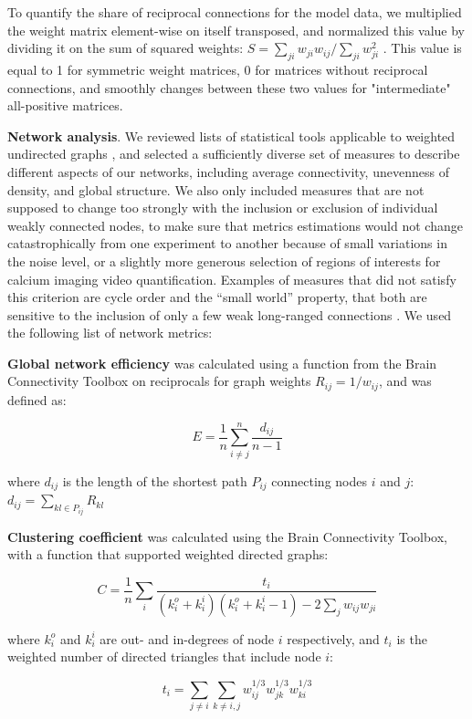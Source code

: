 \documentclass{article}
\begin{document}
To quantify the share of reciprocal connections for the model data, we multiplied the weight matrix element-wise on itself transposed, and normalized this value by dividing it on the sum of squared weights: $S=\sum_{ji}{w_{ji} w_{ij}} / \sum_{ji}{w_{ji}^2}$ . This value is equal to 1 for symmetric weight matrices, 0 for matrices without reciprocal connections, and smoothly changes between these two values for "intermediate" all-positive matrices.

\textbf{Network analysis}. We reviewed lists of statistical tools applicable to weighted undirected graphs \citep{rubinov2010toolbox}, and selected a sufficiently diverse set of measures to describe  different aspects of our networks, including average connectivity, unevenness of density, and global structure. We also only included measures that are not supposed to change too strongly with the inclusion or exclusion of individual weakly connected nodes, to make sure that metrics estimations would not change catastrophically from one experiment to another because of small variations in the noise level, or a slightly more generous selection of regions of interests for calcium imaging video quantification. Examples of measures that did not satisfy this criterion are cycle order and the “small world” property, that both are sensitive to the inclusion of only a few weak long-ranged connections \citep{papo2016beware}. We used the following list of network metrics:

\textbf{Global network efficiency} was calculated using a function from the Brain Connectivity Toolbox \citep{rubinov2010toolbox} on reciprocals for graph weights $R_{ij} = 1/w_{ij}$, and was defined as:

\[ E = \frac{1}{n} \sum_{i \neq j}^n{\frac{d_{ij}}{n-1}} \]

where $d_{ij}$ is the length of the shortest path $P_{ij}$ connecting nodes $i$ and $j$: $d_{ij} = \sum_{kl \in P_{ij}}{R_{kl}}$

\textbf{Clustering coefficient} \citep{fagiolo2007} was calculated using the Brain Connectivity Toolbox, with a function that supported weighted directed graphs:

\[ C = \frac{1}{n} \sum_i{\frac {t_i}{(k^o_i+k^i_i)(k^o_i+k^i_i-1)-2\sum_j{w_{ij}w_{ji}}}} \]

where $k^o_i$ and $k^i_i$ are out- and in-degrees of node $i$ respectively, and $t_i$ is the weighted number of directed triangles that include node $i$:

\[ t_i = \sum_{j \neq i}{\sum_{k \neq i,j}{w^{1/3}_{ij}w^{1/3}_{jk}w^{1/3}_{ki}}} \]
\end{document}
